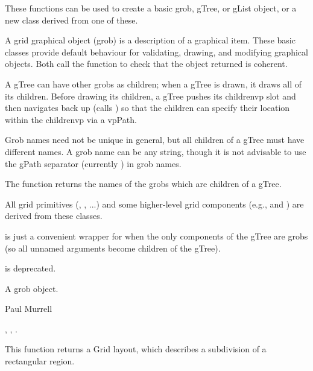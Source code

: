 %
\begin{Details}\relax
These functions can be used to create a basic grob, gTree, or gList
object, or a new class derived from one of these.

A grid graphical object (grob) is a description of a graphical
item.  These basic classes provide default behaviour for
validating, drawing,
and modifying graphical objects.  Both call the function
 to check that the object returned is coherent.

A gTree can have other grobs as children;  when a gTree is drawn, it
draws all of its children.  Before drawing its children, a gTree
pushes its childrenvp slot and then navigates back up (calls
) so that the children can specify their location
within the childrenvp via a vpPath.

Grob names need not be unique in general, but all children of a
gTree must have different names.  
A grob name can be any string, though
it is not
advisable to use the gPath separator  (currently \code{::}) in
grob names.

The function  returns the names of the grobs
which are children of a gTree.

All grid primitives (, , ...) and
some higher-level grid components (e.g.,  and
) are derived from these classes.

 is just a convenient wrapper for 
when the only components of the gTree are grobs (so all
unnamed arguments become children of the gTree).

 is deprecated.

\end{Details}
%
\begin{Value}
A grob object.
\end{Value}
%
\begin{Author}\relax
Paul Murrell
\end{Author}
%
\begin{SeeAlso}\relax
{},
,
.
\end{SeeAlso}
%
\begin{Description}\relax
This function returns a Grid layout, which describes a subdivision
of a rectangular region.
\end{Description}
